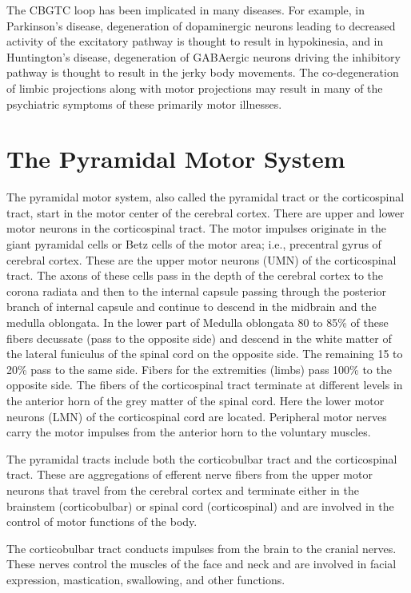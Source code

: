 The CBGTC loop has been implicated in many diseases. For example, in Parkinson's disease, degeneration of dopaminergic neurons leading to decreased activity of the excitatory pathway is thought to result in hypokinesia, and in Huntington's disease, degeneration of GABAergic neurons driving the inhibitory pathway is thought to result in the jerky body movements. The co-degeneration of limbic projections along with motor projections may result in many of the psychiatric symptoms of these primarily motor illnesses.

\hypertarget{the-pyramidal-motor-system}{%
\section{The Pyramidal Motor System}\label{the-pyramidal-motor-system}}

The pyramidal motor system, also called the pyramidal tract or the corticospinal tract, start in the motor center of the cerebral cortex. There are upper and lower motor neurons in the corticospinal tract. The motor impulses originate in the giant pyramidal cells or Betz cells of the motor area; i.e., precentral gyrus of cerebral cortex. These are the upper motor neurons (UMN) of the corticospinal tract. The axons of these cells pass in the depth of the cerebral cortex to the corona radiata and then to the internal capsule passing through the posterior branch of internal capsule and continue to descend in the midbrain and the medulla oblongata. In the lower part of Medulla oblongata 80 to 85\% of these fibers decussate (pass to the opposite side) and descend in the white matter of the lateral funiculus of the spinal cord on the opposite side. The remaining 15 to 20\% pass to the same side. Fibers for the extremities (limbs) pass 100\% to the opposite side. The fibers of the corticospinal tract terminate at different levels in the anterior horn of the grey matter of the spinal cord. Here the lower motor neurons (LMN) of the corticospinal cord are located. Peripheral motor nerves carry the motor impulses from the anterior horn to the voluntary muscles.

The pyramidal tracts include both the corticobulbar tract and the corticospinal tract. These are aggregations of efferent nerve fibers from the upper motor neurons that travel from the cerebral cortex and terminate either in the brainstem (corticobulbar) or spinal cord (corticospinal) and are involved in the control of motor functions of the body.

The corticobulbar tract conducts impulses from the brain to the cranial nerves. These nerves control the muscles of the face and neck and are involved in facial expression, mastication, swallowing, and other functions.

